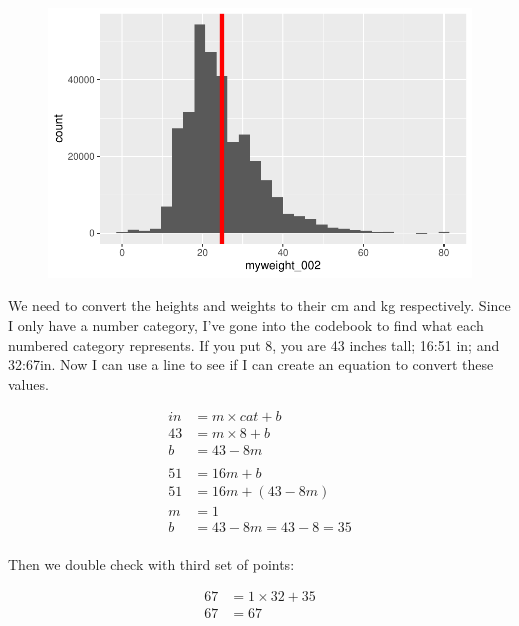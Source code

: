 \documentclass[
  letterpaper,
  DIV=11,
  numbers=noendperiod]{scrartcl}
\newenvironment{Shaded}{\begin{snugshade}}{\end{snugshade}}
\newcommand{\DecValTok}[1]{\textcolor[rgb]{0.68,0.00,0.00}{#1}}
\newcommand{\NormalTok}[1]{\textcolor[rgb]{0.00,0.23,0.31}{#1}}
\newcommand{\OtherTok}[1]{\textcolor[rgb]{0.00,0.23,0.31}{#1}}
\newcommand{\SpecialCharTok}[1]{\textcolor[rgb]{0.37,0.37,0.37}{#1}}
\begin{document}
\begin{enumerate}
  \begin{figure}[H]

  {\centering \includegraphics{BMI_help_files/figure-pdf/unnamed-chunk-8-1.pdf}

  }

  \end{figure}
\end{enumerate}

We need to convert the heights and weights to their cm and kg
respectively. Since I only have a number category, I've gone into the
codebook to find what each numbered category represents. If you put 8,
you are 43 inches tall; 16:51 in; and 32:67in. Now I can use a line to
see if I can create an equation to convert these values.

\[
\begin{align}
in & = m\times cat+b \\
43 &= m \times 8 + b \\
b & = 43-8m \\
\\
51 &= 16m + b \\
51 &= 16m + (43-8m) \\
m &=1 \\ 
b&=43-8m = 43-8=35 \\
\end{align}
\]

Then we double check with third set of points:

\[
\begin{align}
67 & = 1 \times 32 + 35 \\
67 & = 67 \\
\end{align}
\]

\begin{Shaded}
\end{Shaded}
\end{document}
